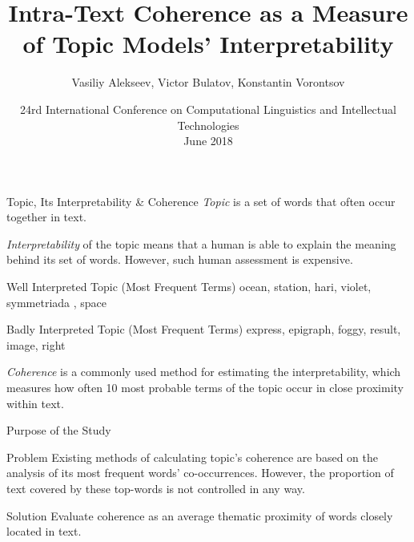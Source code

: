 \documentclass[russian]{beamer}
\title[Intra-Text Coherence]
{
  Intra-Text Coherence as a Measure of Topic Models’ Interpretability
}
\subtitle{}
\author[Vasiliy Alekseev]{
  Vasiliy Alekseev, %
  Victor Bulatov,
  Konstantin Vorontsov
}
\institute[]
{
  \footnotesize
}
\date[Dialogue 2018]
{
  \footnotesize
  {
    24rd International Conference on Computational Linguistics and Intellectual Technologies\\ \bigskip 1 June 2018
  }
}
\begin{document}

		

  
\frame{\titlepage}


\begin{frame}{Topic, Its Interpretability \& Coherence}
  \emph{Topic} is a set of words that often occur together in text.
  
  \medskip
  
  \emph{Interpretability} of the topic means that a human is able to explain the meaning behind its set of words.
  However, such human assessment is expensive.
  
  \vspace{0.25cm}
  
  \begin{exampleblock}{Well Interpreted Topic (Most Frequent Terms)}
    ocean, station, hari, violet, symmetriada , space
  \end{exampleblock}
  
  \begin{alertblock}{Badly Interpreted Topic (Most Frequent Terms)}
    express, epigraph, foggy, result, image, right
  \end{alertblock}
  
  \vspace{0.25cm}
  
  \emph{Coherence} is a commonly used method for estimating the interpretability, which measures how often 10 most probable terms of the topic occur in close proximity within text.
\end{frame}


\begin{frame}{Purpose of the Study}
  \begin{block}{Problem}
    Existing methods of calculating topic's coherence are based on the analysis of its most frequent words' co-occurrences.
    However, the proportion of text covered by these top-words is not controlled in any way.
  \end{block}
  \begin{block}{Solution}
    Evaluate coherence as an average thematic proximity of words closely located in text.
  \end{block}
\end{frame}
\end{document}
